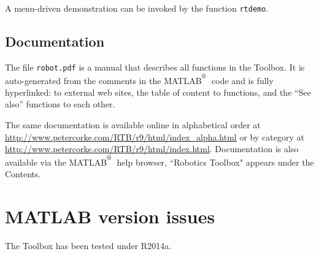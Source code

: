 \documentclass[a4paper]{report}
\def\Mlab{MATLAB$^{\textsuperscript{\textregistered}}$}
\begin{document}
A menu-driven demonstration can be invoked by the function {\tt rtdemo}.

\subsection{Documentation}
The file {\tt robot.pdf} is a manual that describes all functions in the Toolbox.
It is auto-generated from the comments in the \Mlab\ code and is fully hyperlinked:
to external web sites, the table of content to functions, and the ``See also'' functions
to each other.

The same documentation is available online in
alphabetical order at \url{http://www.petercorke.com/RTB/r9/html/index_alpha.html}
or by category at \url{http://www.petercorke.com/RTB/r9/html/index.html}.
Documentation is also available via the \Mlab\ help browser, ``Robotics
Toolbox" appears under the Contents.


\section{MATLAB version issues}
The Toolbox has been tested under R2014a.
\end{document}
